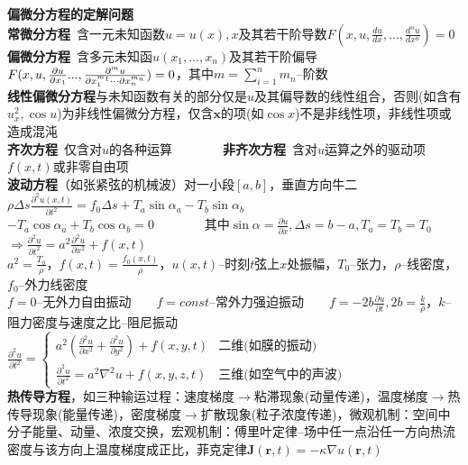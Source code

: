 \documentclass[10pt,a4paper]{article}
\begin{document}
\scriptsize
\begin{multicols}{2}
\textbf{偏微分方程的定解问题}\\
\textbf{常微分方程}~含一元未知函数$u=u(x),x$及其若干阶导数$F(x,u,\frac{du}{dx},...,\frac{d^nu}{dx^n})=0$\\
\textbf{偏微分方程}~含多元未知函$u(x_1,...,x_n)$及其若干阶偏导$F(x,u,\frac{\partial u}{\partial x_1}\\...,\frac{\partial^mu}{\partial x_1^{m_1}\cdots\partial x_n^{m_n}})=0$，其中$m=\sum_{i=1}^{n}m_n$--阶数\\
\textbf{线性偏微分方程}与未知函数有关的部分仅是$u$及其偏导数的线性组合，否则(如含有$u_x^2,\cos u$)为非线性偏微分方程，仅含$\bm{x}$的项(如$\cos x$)不是非线性项，非线性项或造成混沌\\
\textbf{齐次方程}~仅含对$u$的各种运算~~~~~~~~\textbf{非齐次方程}~含对$u$运算之外的驱动项$f(x,t)$或非零自由项\\
\textbf{波动方程}\tiny（如张紧弦的机械波）对一小段$[a,b]$，垂直方向牛二$\rho\Delta s\frac{\partial^2u(x,t)}{\partial t^2}=f_0\Delta s+T_a\sin\alpha_a-T_b\sin\alpha_b$\\
$-T_a\cos\alpha_a+T_b\cos\alpha_b=0$~~~~~~~~其中$\sin\alpha=\frac{\partial u}{\partial x},\Delta s=b-a,T_a=T_b=T_0$\\
\indent\scriptsize$\Longrightarrow\frac{\partial^2u}{\partial t^2}=a^2\frac{\partial^2u}{\partial x^2}+f(x,t)$\tiny\\
$a^2=\frac{T_0}{\rho}$，$f(x,t)=\frac{f_0(x,t)}{\rho}$，$u(x,t)$--时刻$t$弦上$x$处振幅，$T_0$--张力，$\rho$--线密度，$f_0$--外力线密度\\
$f=0$--无外力自由振动~~~~$f=const$--常外力强迫振动~~~~$f=-2b\frac{\partial u}{\partial t},2b=\frac{k}{\rho}$，$k$--阻力密度与速度之比--阻尼振动\scriptsize\\
\indent$\frac{\partial^2u}{\partial t^2}=\left\{\begin{array}{ll}a^2(\frac{\partial^2u}{\partial x^2}+\frac{\partial^2u}{\partial y^2})+f(x,y,t)&\text{二维(如膜的振动)}\\\frac{\partial^2u}{\partial t^2}=a^2\nabla^2u+f(x,y,z,t)&\text{三维(如空气中的声波)}\end{array}\right.$\\
\textbf{热传导方程}，如三种输运过程：速度梯度$\to$粘滞现象(动量传递)，温度梯度$\to$热传导现象(能量传递)，密度梯度$\to$扩散现象(粒子浓度传递)，微观机制：空间中分子能量、动量、浓度交换，宏观机制：傅里叶定律--场中任一点沿任一方向热流密度与该方向上温度梯度成正比，菲克定律$\bm{J}(\bm{r},t)=-\kappa\nabla u(\bm{r},t)$\\

\end{multicols}
\end{document}
